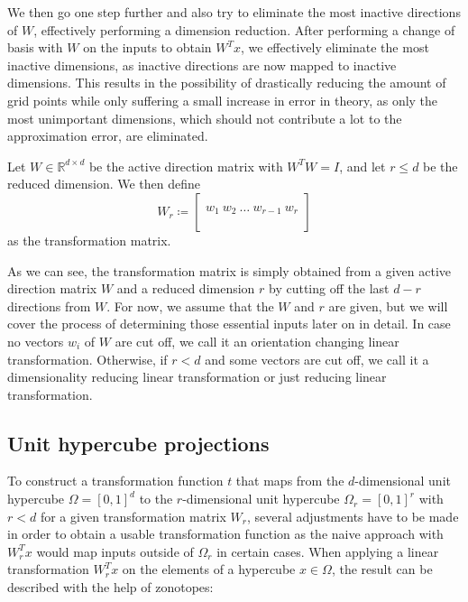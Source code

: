 \documentclass[
  a4paper,  %
  twoside,  %
  bibliography=totoc,
  headsepline,
  cleardoublepage=empty,
  parskip=half,
  draft=false
]{scrbook}
\begin{document}
We then go one step further and also try to eliminate the most inactive directions of $W$, effectively performing a dimension reduction.
After performing a change of basis with $W$ on the inputs to obtain $W^T x$, we effectively eliminate the most inactive dimensions, as inactive directions are now mapped to inactive dimensions.
This results in the possibility of drastically reducing the amount of grid points while only suffering a small increase in error in theory, as only the most unimportant dimensions, which should not contribute a lot to the approximation error, are eliminated.

\begin{definition}
Let $W \in \mathds{R}^{d \times d}$ be the active direction matrix with $W^T W=I$, and let $r \leq d$ be the reduced dimension.
We then define
\begin{equation}
W_r \coloneqq \begin{bmatrix}
  \\
    w_1 ~ w_2 ~ \dots ~ w_{r-1} ~ w_r\\
    \\
  \end{bmatrix}
\end{equation}
as the transformation matrix.
\end{definition}
%
As we can see, the transformation matrix is simply obtained from a given active direction matrix $W$ and a reduced dimension $r$ by cutting off the last $d - r$ directions from $W$.
For now, we assume that the $W$ and $r$ are given, but we will cover the process of determining those essential inputs later on in detail.
In case no vectors $w_i$ of $W$ are cut off, we call it an orientation changing linear transformation.
Otherwise, if $r < d$ and some vectors are cut off, we call it a dimensionality reducing linear transformation or just reducing linear transformation.

\subsection{Unit hypercube projections}

To construct a transformation function $t$ that maps from the $d$-dimensional unit hypercube $\Omega=[0,1]^d$ to the $r$-dimensional unit hypercube $\Omega_r=[0,1]^r$ with $r < d$ for a given transformation matrix $W_r$, several adjustments have to be made in order to obtain a usable transformation function as the naive approach with $W_r^T x$ would map inputs outside of $\Omega_r$ in certain cases.
When applying a linear transformation $W_r^T x$ on the elements of a hypercube $x \in \Omega$, the result can be described with the help of zonotopes:
\end{document}
